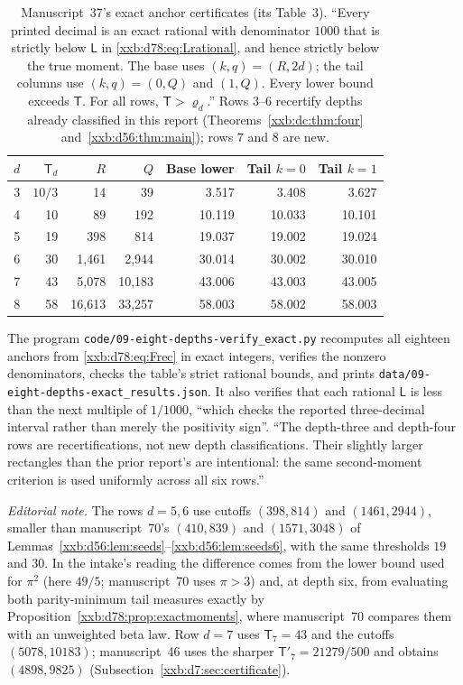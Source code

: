 \documentclass[11pt,a4paper]{article}
\numberwithin{equation}{section}
\theoremstyle{definition}
\theoremstyle{remark}
\theoremstyle{plain}
\begin{document}
\begingroup
\renewcommand{\thetable}{\thesection.D}%
\renewcommand{\theHtable}{xxb.d78.\thesection.D}%
\begin{table}[!htbp]
\centering\small
\begin{tabular}{@{}rrrrrrr@{}}
\toprule
$d$ & $\mathsf T_d$ & $R$ & $Q$ & Base lower & Tail $k=0$ & Tail $k=1$\\
\midrule
3 & $10/3$ & 14 & 39 & 3.517 & 3.408 & 3.627\\
4 & 10 & 89 & 192 & 10.119 & 10.033 & 10.101\\
5 & 19 & 398 & 814 & 19.037 & 19.002 & 19.024\\
6 & 30 & 1,461 & 2,944 & 30.014 & 30.002 & 30.010\\
7 & 43 & 5,078 & 10,183 & 43.006 & 43.003 & 43.005\\
8 & 58 & 16,613 & 33,257 & 58.003 & 58.002 & 58.003\\
\bottomrule
\end{tabular}
\caption{Manuscript~37's exact anchor certificates (its Table~3).  ``Every
printed decimal is an exact rational with denominator $1000$ that is strictly
below $\mathsf L$ in \eqref{xxb:d78:eq:Lrational}, and hence strictly below the
true moment. The base uses $(k,q)=(R,2d)$; the tail columns use $(k,q)=(0,Q)$
and $(1,Q)$. Every lower bound exceeds $\mathsf T$. For all rows,
$\mathsf T>\varrho_d$.''  Rows $3$--$6$ recertify depths already classified
in this report (Theorems~\ref{xxb:dc:thm:four} and~\ref{xxb:d56:thm:main});
rows $7$ and $8$ are new.}\label{xxb:d78:tab:anchors}
\end{table}
\endgroup
\addtocounter{table}{-1}

The program \texttt{code/09-eight-\allowbreak depths-\allowbreak verify\_exact.py}
recomputes all eighteen anchors from \eqref{xxb:d78:eq:Frec} in exact
integers, verifies the nonzero denominators, checks the table's strict
rational bounds, and prints \texttt{data/09-eight-\allowbreak depths-\allowbreak exact\_results.json}.
It also verifies that each rational $\mathsf L$ is less than the next multiple
of $1/1000$, ``which checks the reported three-decimal interval rather than
merely the positivity sign''.  ``The depth-three and depth-four rows are
recertifications, not new depth classifications. Their slightly larger
rectangles than the prior report's are intentional: the same second-moment
criterion is used uniformly across all six rows.''

\emph{Editorial note.}  The rows $d=5,6$ use cutoffs $(398,814)$ and
$(1461,2944)$, smaller than manuscript~70's $(410,839)$ and $(1571,3048)$ of
Lemmas~\ref{xxb:d56:lem:seeds}--\ref{xxb:d56:lem:seeds6}, with the same
thresholds $19$ and $30$.  In the intake's reading the difference comes from
the lower bound used for $\pi^2$ (here $49/5$; manuscript~70 uses $\pi>3$)
and, at depth six, from evaluating both parity-minimum tail measures exactly
by Proposition~\ref{xxb:d78:prop:exactmoments}, where manuscript~70 compares
them with an unweighted beta law.  Row $d=7$ uses $\mathsf T_7=43$ and the
cutoffs $(5078,10183)$; manuscript~46 uses the sharper
$\mathsf T'_7=21279/500$ and obtains $(4898,9825)$
(Subsection~\ref{xxb:d7:sec:certificate}).
\end{document}
